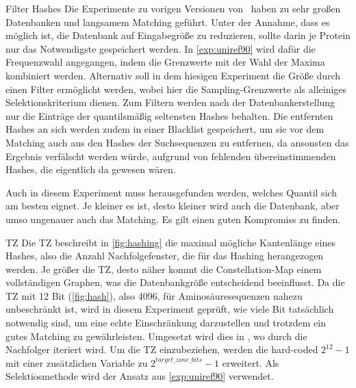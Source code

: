     \begin{experiment}{Filter Hashes} %
        \label{exp:filter_hashes}
        Die Experimente zu vorigen Versionen von \protfin\ haben zu sehr großen Datenbanken und langsamem Matching geführt. Unter der Annahme, dass es möglich ist, die Datenbank auf Eingabegröße zu reduzieren, sollte darin je Protein nur das Notwendigste gespeichert werden. In \autoref{exp:uniref90} wird dafür die Frequenzwahl angegangen, indem die Grenzwerte mit der Wahl der Maxima kombiniert werden. Alternativ soll in dem hiesigen Experiment die Größe durch einen Filter ermöglicht werden, wobei hier die Sampling-Grenzwerte als alleiniges Selektionskriterium dienen. Zum Filtern werden nach der Datenbankerstellung nur die Einträge der quantilsmäßig seltensten Hashes behalten. Die entfernten Hashes an sich werden zudem in einer Blacklist gespeichert, um sie vor dem Matching auch aus den Hashes der Suchsequenzen zu entfernen, da ansonsten das Ergebnis verfälscht werden würde, aufgrund von fehlenden übereinstimmenden Hashes, die eigentlich da gewesen wären.

        Auch in diesem Experiment muss herausgefunden werden, welches Quantil sich am besten eignet. Je kleiner es ist, desto kleiner wird auch die Datenbank, aber umso ungenauer auch das Matching. Es gilt einen guten Kompromiss zu finden.
    \end{experiment}
    \begin{experiment}{\acl{TZ}} %
        \label{exp:target_zone}
        Die \ac{TZ} beschreibt in \autoref{fig:hashing} die maximal mögliche Kantenlänge eines Hashes, also die Anzahl Nachfolgefenster, die für das Hashing herangezogen werden. Je größer die \ac{TZ}, desto näher kommt die Constellation-Map einem vollständigen Graphen, was die Datenbankgröße entscheidend beeinflusst. Da die \ac{TZ} mit 12 Bit (\autoref{fig:hash}), also 4096, für Aminosäuresequenzen nahezu unbeschränkt ist, wird in diesem Experiment geprüft, wie viele Bit tatsächlich notwendig sind, um eine echte Einschränkung darzustellen und trotzdem ein gutes Matching zu gewährleisten. Umgesetzt wird dies in , wo durch die Nachfolger iteriert wird. Um die \ac{TZ} einzubeziehen, werden die hard-coded $2^{12} - 1$ mit einer zusätzlichen Variable zu $2^{target\_zone\_bits} - 1$ erweitert. Als Selektiosmethode wird der Ansatz aus \autoref{exp:uniref90} verwendet.
    \end{experiment}

